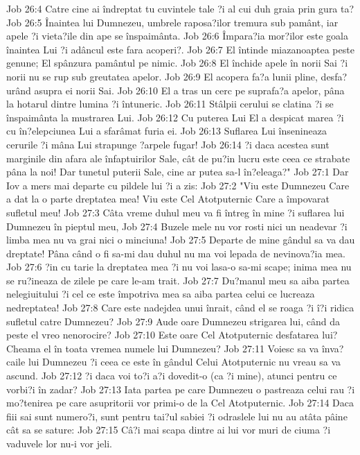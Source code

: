 Job 26:4  Catre cine ai îndreptat tu cuvintele tale ?i al cui duh graia prin gura ta?
Job 26:5  Înaintea lui Dumnezeu, umbrele raposa?ilor tremura sub pamânt, iar apele ?i vieta?ile din ape se înspaimânta.
Job 26:6  Împara?ia mor?ilor este goala înaintea Lui ?i adâncul este fara acoperi?.
Job 26:7  El întinde miazanoaptea peste genune; El spânzura pamântul pe nimic.
Job 26:8  El închide apele în norii Sai ?i norii nu se rup sub greutatea apelor.
Job 26:9  El acopera fa?a lunii pline, desfa?urând asupra ei norii Sai.
Job 26:10  El a tras un cerc pe suprafa?a apelor, pâna la hotarul dintre lumina ?i întuneric.
Job 26:11  Stâlpii cerului se clatina ?i se înspaimânta la mustrarea Lui.
Job 26:12  Cu puterea Lui El a despicat marea ?i cu în?elepciunea Lui a sfarâmat furia ei.
Job 26:13  Suflarea Lui însenineaza cerurile ?i mâna Lui strapunge ?arpele fugar!
Job 26:14  ?i daca acestea sunt marginile din afara ale înfaptuirilor Sale, cât de pu?in lucru este ceea ce strabate pâna la noi! Dar tunetul puterii Sale, cine ar putea sa-l în?eleaga?"
Job 27:1  Dar Iov a mers mai departe cu pildele lui ?i a zis:
Job 27:2  "Viu este Dumnezeu Care a dat la o parte dreptatea mea! Viu este Cel Atotputernic Care a împovarat sufletul meu!
Job 27:3  Câta vreme duhul meu va fi întreg în mine ?i suflarea lui Dumnezeu în pieptul meu,
Job 27:4  Buzele mele nu vor rosti nici un neadevar ?i limba mea nu va grai nici o minciuna!
Job 27:5  Departe de mine gândul sa va dau dreptate! Pâna când o fi sa-mi dau duhul nu ma voi lepada de nevinova?ia mea.
Job 27:6  ?in cu tarie la dreptatea mea ?i nu voi lasa-o sa-mi scape; inima mea nu se ru?ineaza de zilele pe care le-am trait.
Job 27:7  Du?manul meu sa aiba partea nelegiuitului ?i cel ce este împotriva mea sa aiba partea celui ce lucreaza nedreptatea!
Job 27:8  Care este nadejdea unui înrait, când el se roaga ?i î?i ridica sufletul catre Dumnezeu?
Job 27:9  Aude oare Dumnezeu strigarea lui, când da peste el vreo nenorocire?
Job 27:10  Este oare Cel Atotputernic desfatarea lui? Cheama el în toata vremea numele lui Dumnezeu?
Job 27:11  Voiesc sa va înva? caile lui Dumnezeu ?i ceea ce este în gândul Celui Atotputernic nu vreau sa va ascund.
Job 27:12  ?i daca voi to?i a?i dovedit-o (ca ?i mine), atunci pentru ce vorbi?i în zadar?
Job 27:13  Iata partea pe care Dumnezeu o pastreaza celui rau ?i mo?tenirea pe care asupritorii vor primi-o de la Cel Atotputernic.
Job 27:14  Daca fiii sai sunt numero?i, sunt pentru tai?ul sabiei ?i odraslele lui nu au atâta pâine cât sa se sature:
Job 27:15  Câ?i mai scapa dintre ai lui vor muri de ciuma ?i vaduvele lor nu-i vor jeli.

